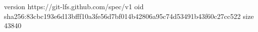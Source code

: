 version https://git-lfs.github.com/spec/v1
oid sha256:83cbc193e6d13bfff10a3fe56d7bf014b42806a95c74d53491b43f60c27cc522
size 43840
